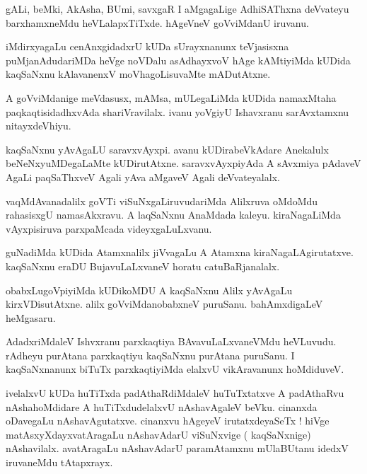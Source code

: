 \documentclass{article}
\begin{document}
\begin{mn}%
gALi, beMki, AkAsha, BUmi, savxgaR I  aMgagaLige AdhiSAThxna deVvateyu barxhamxneMdu 
heVLalapxTiTxde. hAgeVneV goVviMdanU iruvanu.
\end{mn}

\begin{mn}%
iMdirxyagaLu cenAnxgidadxrU kUDa sUrayxnanunx teVjasisxna puMjanAdudariMDa heVge noVDalu 
asAdhayxvoV hAge kAMtiyiMda kUDida kaqSaNxnu kAlavanenxV moVhagoLisuvaMte mADutAtxne.
\end{mn}

\begin{mn}%
A goVviMdanige meVdasusx, mAMsa, mULegaLiMda kUDida namaxMtaha paqkaqtisidadhxvAda 
shariVravilalx. ivanu yoVgiyU Ishavxranu sarAvxtamxnu nitayxdeVhiyu.
\end{mn}

\begin{mn}%
kaqSaNxnu yAvAgaLU saravxvAyxpi. avanu kUDirabeVkAdare Anekalulx beNeNxyuMDegaLaMte 
kUDirutAtxne. saravxvAyxpiyAda A sAvxmiya pAdaveV AgaLi paqSaThxveV Agali yAva aMgaveV Agali 
deVvateyalalx.
\end{mn}

\begin{mn}%
vaqMdAvanadalilx goVTi viSuNxgaLiruvudariMda Alilxruva oMdoMdu rahasisxgU namasAkxravu. A 
laqSaNxnu AnaMdada kaleyu. kiraNagaLiMda vAyxpisiruva parxpaMcada videyxgaLuLxvanu.
\end{mn}

\begin{mn}%
guNadiMda kUDida Atamxnalilx jiVvagaLu A Atamxna kiraNagaLAgirutatxve. kaqSaNxnu eraDU 
BujavuLaLxvaneV horatu catuBaRjanalalx.
\end{mn}

\begin{mn}%
obabxLugoVpiyiMda kUDikoMDU A kaqSaNxnu Alilx yAvAgaLu kirxVDisutAtxne. alilx 
goVviMdanobabxneV puruSanu. bahAmxdigaLeV heMgasaru.
\end{mn}

\begin{mn}%
AdadxriMdaleV Ishvxranu parxkaqtiya BAvavuLaLxvaneVMdu heVLuvudu. rAdheyu purAtana 
parxkaqtiyu kaqSaNxnu purAtana puruSanu. I kaqSaNxnanunx biTuTx parxkaqtiyiMda elalxvU 
vikAravanunx hoMdiduveV.
\end{mn}

\begin{mn}%
ivelalxvU kUDa huTiTxda padAthaRdiMdaleV huTuTxtatxve A padAthaRvu nAshahoMdidare A 
huTiTxdudelalxvU nAshavAgaleV beVku. cinanxda oDavegaLu nAshavAgutatxve. cinanxvu hAgeyeV 
irutatxdeyaSeTx ! hiVge matAsxyXdayxvatAragaLu nAshavAdarU viSuNxvige ( kaqSaNxnige) 
nAshavilalx. avatAragaLu nAshavAdarU paramAtamxnu mUlaBUtanu idedxV iruvaneMdu tAtapxrayx.
\end{mn}
\end{document}
